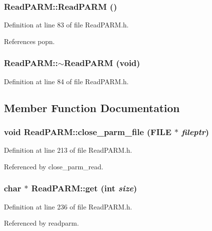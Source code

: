 \subsubsection{\setlength{\rightskip}{0pt plus 5cm}Read\-PARM::Read\-PARM ()\hspace{0.3cm}{\tt  [inline]}}\label{classReadPARM_a0}




Definition at line 83 of file Read\-PARM.h.

References popn.
\subsubsection{\setlength{\rightskip}{0pt plus 5cm}Read\-PARM::$\sim$Read\-PARM (void)\hspace{0.3cm}{\tt  [inline]}}\label{classReadPARM_a1}




Definition at line 84 of file Read\-PARM.h.

\subsection{Member Function Documentation}
\subsubsection{\setlength{\rightskip}{0pt plus 5cm}void Read\-PARM::close\_\-parm\_\-file (FILE $\ast$ {\em fileptr})}\label{classReadPARM_a3}




Definition at line 213 of file Read\-PARM.h.

Referenced by close\_\-parm\_\-read.
\subsubsection{\setlength{\rightskip}{0pt plus 5cm}char $\ast$ Read\-PARM::get (int {\em size})}\label{classReadPARM_a4}




Definition at line 236 of file Read\-PARM.h.

Referenced by readparm.
